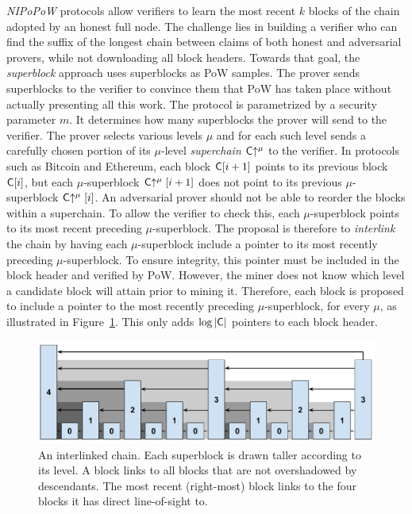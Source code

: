 \emph{NIPoPoW} protocols allow verifiers to
learn the most recent $k$ blocks of the chain adopted by an honest full
node. The challenge lies in building a
verifier who can find the suffix of the longest chain between claims of both
honest and adversarial provers, while not downloading all block headers. Towards
that goal, the \emph{superblock} approach uses superblocks as PoW samples.
The prover sends superblocks to the verifier to convince them
that PoW has taken place without actually presenting all this
work. The protocol is parametrized by a security parameter
$m$. It determines how many superblocks the prover will send to the verifier.
The prover selects various levels $\mu$ and for each such level sends a
carefully chosen portion of its $\mu$-level \emph{superchain}
$\mathsf{C}\negthickspace\uparrow^\mu$ to the verifier. In protocols such as
Bitcoin and Ethereum, each block $\mathsf{C}[i + 1]$ points to its
previous block $\mathsf{C}[i]$, but each $\mu$-superblock $\mathsf{C}\negthickspace\uparrow^\mu[i +
1]$ does not point to its previous $\mu$-superblock $\mathsf{C}\negthickspace\uparrow^\mu[i]$.
An adversarial prover should not be able to reorder the blocks within a
superchain. To allow the verifier to check this, each $\mu$-superblock
points to its most recent preceding $\mu$-superblock. The proposal is
therefore to \emph{interlink} the chain by having each $\mu$-superblock include
a pointer to its most recently preceding $\mu$-superblock. To ensure
integrity, this pointer must be included in the block header and verified by
PoW. However, the miner does not know which level a candidate block
will attain prior to mining it. Therefore, each block is proposed to
include a pointer to the most recently preceding $\mu$-superblock, for every
$\mu$, as illustrated in Figure~\ref{fig.hierarchy}. This only adds
$\log|\mathsf{C}|$ pointers to each block header.

\begin{figure}[ht]
    \centering
    \includegraphics[width=0.8\columnwidth,keepaspectratio]{figures/level-shadows.pdf}
    \caption{An interlinked chain. Each superblock is drawn taller
    according to its level. A block links to all blocks that are
    not overshadowed by descendants. The most recent (right-most)
    block links to the four blocks it has direct line-of-sight to.}
    \label{fig.hierarchy}
\end{figure}

